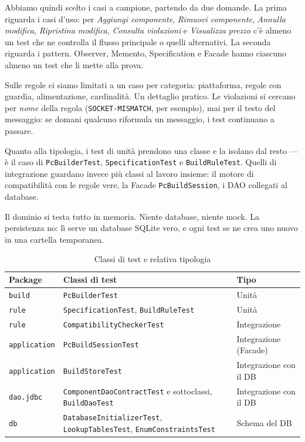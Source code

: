 \documentclass[12pt,a4paper]{article}
\begin{document}
Abbiamo quindi scelto i casi a campione, partendo da due domande. La prima riguarda i casi d'uso: per
\emph{Aggiungi componente}, \emph{Rimuovi componente}, \emph{Annulla modifica}, \emph{Ripristina modifica},
\emph{Consulta violazioni} e \emph{Visualizza prezzo} c'è almeno un test che ne controlla il flusso
principale o quelli alternativi. La seconda riguarda i pattern. Observer, Memento, Specification e Facade
hanno ciascuno almeno un test che li mette alla prova.

Sulle regole ci siamo limitati a un caso per categoria: piattaforma, regole con guardia, alimentazione,
cardinalità. Un dettaglio pratico. Le violazioni si cercano per \emph{nome} della regola
(\texttt{SOCKET-MISMATCH}, per esempio), mai per il testo del messaggio: se domani qualcuno riformula un
messaggio, i test continuano a passare.

Quanto alla tipologia, i test di unità prendono una classe e la isolano dal resto --- è il caso di
\texttt{PcBuilderTest}, \texttt{SpecificationTest} e \texttt{BuildRuleTest}. Quelli di integrazione
guardano invece più classi al lavoro insieme: il motore di compatibilità con le regole vere, la Facade
\texttt{PcBuildSession}, i DAO collegati al database.

Il dominio si testa tutto in memoria. Niente database, niente mock. La persistenza no: lì serve un
database SQLite vero, e ogni test se ne crea uno nuovo in una cartella temporanea.

\begin{table}[H]
\centering
\begin{tabularx}{\textwidth}{|l|>{\raggedright\arraybackslash}X|l|}
\hline
\textbf{Package} & \textbf{Classi di test} & \textbf{Tipo} \\
\hline
\texttt{build}       & \texttt{PcBuilderTest}                                   & Unità \\
\texttt{rule}        & \texttt{SpecificationTest}, \texttt{BuildRuleTest}       & Unità \\
\texttt{rule}        & \texttt{CompatibilityCheckerTest}                        & Integrazione \\
\texttt{application} & \texttt{PcBuildSessionTest}                              & Integrazione (Facade) \\
\texttt{application} & \texttt{BuildStoreTest}                                  & Integrazione con il DB \\
\texttt{dao.jdbc}    & \texttt{ComponentDaoContractTest} e sottoclassi, \texttt{BuildDaoTest} & Integrazione con il DB \\
\texttt{db}          & \texttt{DatabaseInitializerTest}, \texttt{LookupTablesTest}, \texttt{EnumConstraintsTest} & Schema del DB \\
\hline
\end{tabularx}
\caption{Classi di test e relativa tipologia}
\label{tab:test-classi}
\end{table}
\end{document}
